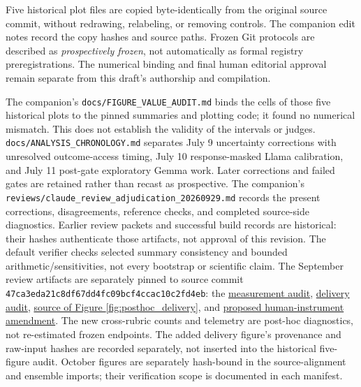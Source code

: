 \documentclass[11pt]{article}
\newcommand{\reviewartifact}[2]{\href{https://github.com/tdj28/llm_selfref_pre/blob/47ca3eda21c8df67dd4fc09bcf4ccac10c2fd4eb/#1}{#2}}
\begin{document}
Five historical plot files are copied byte-identically from the original source commit,
without redrawing, relabeling, or removing controls. The companion edit notes
record the copy hashes and source paths. Frozen Git protocols are described
as \emph{prospectively frozen}, not automatically as formal registry
preregistrations. The numerical binding and final human editorial approval
remain separate from this draft's authorship and compilation.

The companion's \texttt{docs/FIGURE\_VALUE\_AUDIT.md} binds the cells of those
five historical plots to the pinned summaries and plotting code; it found no numerical
mismatch. This does not establish the validity of the intervals or judges.
\texttt{docs/ANALYSIS\_CHRONOLOGY.md} separates July 9 uncertainty
corrections with unresolved outcome-access timing, July 10 response-masked
Llama calibration, and July 11 post-gate exploratory Gemma work. Later
corrections and failed gates are retained rather than recast as prospective.
The companion's \texttt{reviews/claude\_review\_adjudication\_20260929.md}
records the present corrections, disagreements, reference checks, and completed
source-side diagnostics. Earlier review packets and successful build records
are historical: their hashes authenticate those artifacts, not approval of
this revision. The default verifier checks selected summary consistency and
bounded arithmetic/sensitivities, not every bootstrap or scientific claim.
The September review artifacts are separately pinned to source commit
\texttt{47ca3eda21c8df67dd4fc09bcf4ccac10c2fd4eb}:
the \reviewartifact{docs/review_audit_20260929/measurement/audit.json}{measurement audit},
\reviewartifact{docs/review_audit_20260929/steering_delivery.json}{delivery audit},
\reviewartifact{docs/review_audit_20260929/baseline_gemma_delivery.pdf}{source of Figure \ref{fig:posthoc_delivery}},
and \reviewartifact{docs/HUMAN_INSTRUMENT_VALIDATION_AMENDMENT_20260929.md}{proposed human-instrument amendment}.
The new cross-rubric counts and telemetry are post-hoc diagnostics, not
re-estimated frozen endpoints. The added delivery figure's provenance and raw-input
hashes are recorded separately, not inserted into the historical five-figure audit.
October figures are separately hash-bound in the source-alignment and
ensemble imports; their verification scope is documented in each manifest.

\FloatBarrier
\begingroup
\raggedright


\endgroup
\end{document}
